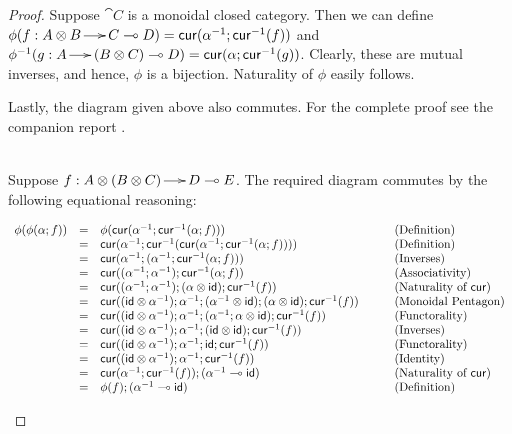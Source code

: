 \begin{proof}
  Suppose $\cat{C}$ is a monoidal closed category.  Then we can define
  $\phi(f : A \otimes B \to C \multimap D) = \mathsf{cur}(\alpha^{-1} ; \mathsf{cur}^{-1}(f))$
  and $\phi^{-1}(g : A \to (B \otimes C) \multimap D) = \mathsf{cur}(\alpha ;
    \mathsf{cur}^{-1}(g))$.  Clearly, these are mutual inverses, and hence, $\phi$
  is a bijection.  Naturality of $\phi$ easily follows. \begin{paper}
    Lastly, the diagram given above also commutes.  For the complete
    proof see the companion report \cite{Eades:2015}.
  \end{paper}

  \begin{report}
    \ \\
  \noindent
  Suppose $f : A \otimes (B \otimes C) \to D \multimap E$.  The required
  diagram commutes by the following equational reasoning:
  \begin{center}
    \begin{math}
      \begin{array}{lllllllll}
        \phi(\phi(\alpha;f))
        & = & \phi(\mathsf{cur}(\alpha^{-1};\mathsf{cur}^{-1}(\alpha;f))) & \quad & \text{(Definition)}\\
        & = & \mathsf{cur}(\alpha^{-1};\mathsf{cur}^{-1}(\mathsf{cur}(\alpha^{-1};\mathsf{cur}^{-1}(\alpha;f)))) && \text{(Definition)}\\
        & = & \mathsf{cur}(\alpha^{-1};(\alpha^{-1};\mathsf{cur}^{-1}(\alpha;f))) && \text{(Inverses)}\\
        & = & \mathsf{cur}((\alpha^{-1};\alpha^{-1});\mathsf{cur}^{-1}(\alpha;f)) && \text{(Associativity)}\\
        & = & \mathsf{cur}((\alpha^{-1};\alpha^{-1});(\alpha \otimes \mathsf{id});\mathsf{cur}^{-1}(f)) && \text{(Naturality of } \mathsf{cur}\text{)}\\
        & = & \mathsf{cur}((\mathsf{id} \otimes \alpha^{-1});\alpha^{-1};(\alpha^{-1} \otimes \mathsf{id});(\alpha \otimes \mathsf{id});\mathsf{cur}^{-1}(f)) && \text{(Monoidal Pentagon)}\\
        & = & \mathsf{cur}((\mathsf{id} \otimes \alpha^{-1});\alpha^{-1};(\alpha^{-1};\alpha \otimes \mathsf{id});\mathsf{cur}^{-1}(f)) && \text{(Functorality)}\\
        & = & \mathsf{cur}((\mathsf{id} \otimes \alpha^{-1});\alpha^{-1};(\mathsf{id} \otimes \mathsf{id});\mathsf{cur}^{-1}(f)) && \text{(Inverses)}\\
        & = & \mathsf{cur}((\mathsf{id} \otimes \alpha^{-1});\alpha^{-1};\mathsf{id};\mathsf{cur}^{-1}(f)) && \text{(Functorality)}\\
        & = & \mathsf{cur}((\mathsf{id} \otimes \alpha^{-1});\alpha^{-1};\mathsf{cur}^{-1}(f)) && \text{(Identity)}\\
        & = & \mathsf{cur}(\alpha^{-1};\mathsf{cur}^{-1}(f));(\alpha^{-1} \multimap \mathsf{id}) && \text{(Naturality of } \mathsf{cur}\text{)}\\
        & = & \phi(f);(\alpha^{-1} \multimap \mathsf{id}) && \text{(Definition)}\\
      \end{array}
    \end{math}
  \end{center}
  \end{report}
\end{proof}
